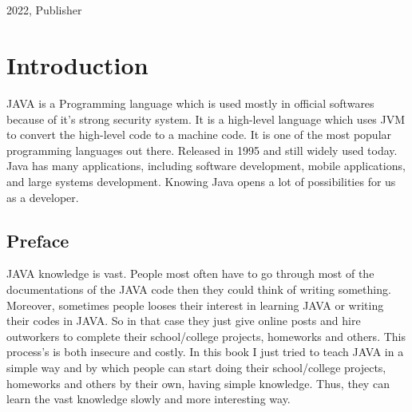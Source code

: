 \documentclass[openany]{book}  %
\begin{document}
\begin{titlepage}
{\begin{verbatim}
                                                                                                                                                                                                                                                                     
                                                                                                                                                                                                                                                                            
                                                                                                      
                                                                                                      
        \end{verbatim}
    }
    \vfill
    {\small{2022, Publisher}}
\end{titlepage}


\pagecolor{smokeWhite}
\color{black}
\newpage
\tableofcontents
\newpage
\listoffigures
\newpage
\listoftables
\newpage
\setlength{\evensidemargin}{1.44614pt}           %
% 
% 
\part{Introduction}
JAVA\cite{Ref1} is a Programming language which is used mostly in official softwares because of it's strong security system.
It is a high-level language which uses JVM to convert the high-level code to a machine code.
It is one of the most popular programming languages out there. Released in 1995 and still widely used today.
Java has many applications, including software development, mobile applications, and large systems development.
Knowing Java opens a lot of possibilities for us as a developer.

\chapter*{Preface}
JAVA\cite{Ref1} knowledge is vast. People most often have to go through most of the documentations of the JAVA code then they could think of writing something.
Moreover, sometimes people looses their interest in learning JAVA or writing their codes in JAVA. So in that case they just give online posts
and hire outworkers to complete their school/college projects, homeworks and others.
This process's is both insecure and costly. In this book I just tried to teach JAVA in a simple way and by which
people can start doing their school/college projects, homeworks and others by their own, having simple knowledge. Thus, they can learn the vast knowledge slowly and more interesting way.
\end{document}
